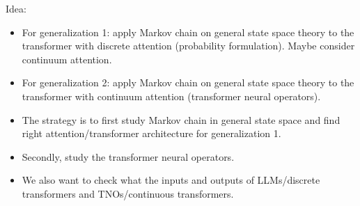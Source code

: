 \documentclass{article}
\begin{document}
Idea:
\begin{itemize}
    \item For generalization 1: apply Markov chain on general state space theory to the transformer with discrete attention (probability formulation). Maybe consider continuum attention.
    \item For generalization 2: apply Markov chain on general state space theory to the transformer with continuum attention (transformer neural operators).
    \item The strategy is to first study Markov chain in general state space and find right attention/transformer architecture for generalization 1.
    \item Secondly, study the transformer neural operators.
    \item We also want to check what the inputs and outputs of LLMs/discrete transformers and TNOs/continuous transformers.
\end{itemize}
\end{document}

